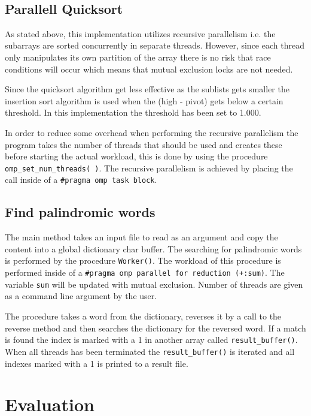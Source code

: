 \documentclass{article}
\begin{document}
\subsection{Parallell Quicksort}

As stated above, this implementation utilizes recursive parallelism i.e. the subarrays are sorted concurrently in separate threads. However, since each thread only manipulates its own partition of the array there is no risk that race conditions will occur which means that mutual exclusion locks are not needed.

Since the quicksort algorithm get less effective as the sublists gets smaller the insertion sort algorithm is used when the (high - pivot) gets below a certain threshold. In this implementation the threshold has been set to 1.000. 

In order to reduce some overhead when performing the recursive parallelism the program takes the number of threads that should be used and creates these before starting the actual workload, this is done by using the procedure \texttt{omp\_set\_num\_threads( )}.
The recursive parallelism is achieved by placing the call inside of a \texttt{#pragma omp task block}. 

\subsection{ Find palindromic words}
The main method takes an input file to read as an argument and copy the content into a global dictionary char buffer. The searching for palindromic words is performed by the procedure \texttt{Worker()}. The workload of this procedure is performed inside of a \texttt{#pragma omp parallel for reduction (+:sum)}. The variable \texttt{sum} will be updated with mutual exclusion. Number of threads are given as a command line argument by the user. 

The procedure takes a word from the dictionary, reverses it by a call to the reverse method and then searches the dictionary for the reversed word. If a match is found the index is marked with a 1 in another array called  \texttt{result\_buffer()}. When all threads has been terminated the \texttt{result\_buffer()} is iterated and all indexes marked with a 1 is printed to a result file. 



\clearpage
\section{Evaluation}
\end{document}
